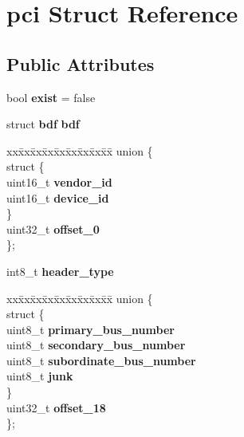\section{pci Struct Reference}
\label{structpci}
\subsection*{Public Attributes}
\begin{DoxyCompactItemize}
\item 
\mbox{\label{structpci_a4fbf5aef85cf6f114ef2c251d1d6c589}} 
bool {\bfseries exist} = false
\item 
\mbox{\label{structpci_a7a1fb1574c140948cd9f7fae2f621e0b}} 
struct \textbf{ bdf} {\bfseries bdf}
\item 
\mbox{\label{structpci_a2834e29859bf5fbad19d4a23c5aa51d8}} 
\begin{tabbing}
xx\=xx\=xx\=xx\=xx\=xx\=xx\=xx\=xx\=\kill
union \{\\
\mbox{\label{unionpci_1_1_0D13_a82f419dcc1fe1810804349324fab05ba}} 
\>struct \{\\
\>\>uint16\_t {\bfseries vendor\_id}\\
\>\>uint16\_t {\bfseries device\_id}\\
\>\} \\
\>uint32\_t {\bfseries offset\_0}\\
\}; \\

\end{tabbing}\item 
\mbox{\label{structpci_a12b405a6b3ed7846f1e45cd06709e794}} 
int8\+\_\+t {\bfseries header\+\_\+type}
\item 
\mbox{\label{structpci_a50137b346b342d2ce39a58d0273ab6cd}} 
\begin{tabbing}
xx\=xx\=xx\=xx\=xx\=xx\=xx\=xx\=xx\=\kill
union \{\\
\mbox{\label{unionpci_1_1_0D15_a981d2ed9425eaf4db7fec65fbd0e979e}} 
\>struct \{\\
\>\>uint8\_t {\bfseries primary\_bus\_number}\\
\>\>uint8\_t {\bfseries secondary\_bus\_number}\\
\>\>uint8\_t {\bfseries subordinate\_bus\_number}\\
\>\>uint8\_t {\bfseries junk}\\
\>\} \\
\>uint32\_t {\bfseries offset\_18}\\
\}; \\


\end{tabbing}
\end{DoxyCompactItemize}
